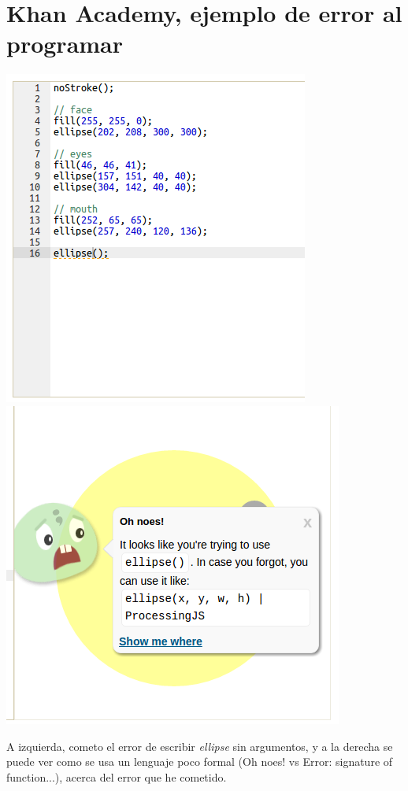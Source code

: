 \documentclass{report}
\begin{document}
	\chapter{Khan Academy, ejemplo de error al programar} \label{app:d}
	
	\begin{center}
	\includegraphics[width=0.45\linewidth]{khanerror}
	\includegraphics[width=0.45\linewidth]{khanerror2}
	
	A izquierda, cometo el error de escribir \textit{ellipse} sin argumentos, y a la derecha se puede ver como se usa un lenguaje poco formal (Oh noes! vs Error: signature of function...), acerca del error que he cometido.
	\end{center}
	
\end{document}
